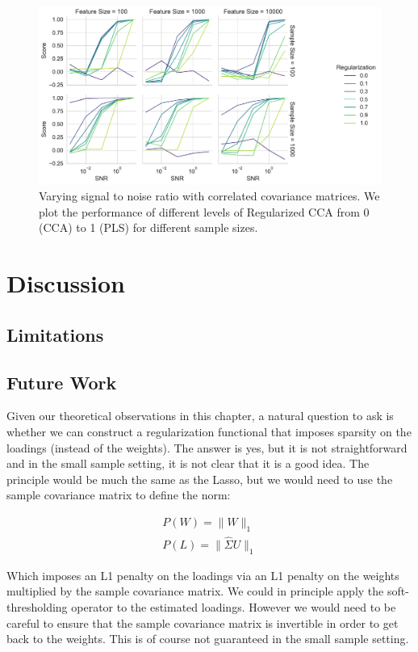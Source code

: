 \begin{figure}
    \centering
    \includegraphics[width=\linewidth]{figures/brain_behaviour_sim/snr_vs_scores_facet_random}
    \caption{Varying signal to noise ratio with correlated covariance matrices. We plot the performance of different levels of Regularized CCA from 0 (CCA) to 1 (PLS) for different sample sizes.}\label{fig:snr-scores-random}
\end{figure}

\section{Discussion}

\subsection{Limitations}


\subsection{Future Work}

Given our theoretical observations in this chapter, a natural question to ask is whether we can construct a regularization functional that imposes sparsity on the \gls{loadings} (instead of the weights).
The answer is yes, but it is not straightforward and in the small sample setting, it is not clear that it is a good idea.
The principle would be much the same as the Lasso, but we would need to use the sample covariance matrix to define the norm:

\begin{align}
    P(W)=\|W\|_1 \\
    P(L)=\|\hat{\Sigma}U\|_1
\end{align}

Which imposes an L1 penalty on the \gls{loadings} via an L1 penalty on the \gls{weights} multiplied by the sample covariance matrix.
We could in principle apply the soft-thresholding operator to the estimated loadings.
However we would need to be careful to ensure that the sample covariance matrix is invertible in order to get back to the weights.
This is of course not guaranteed in the small sample setting.

